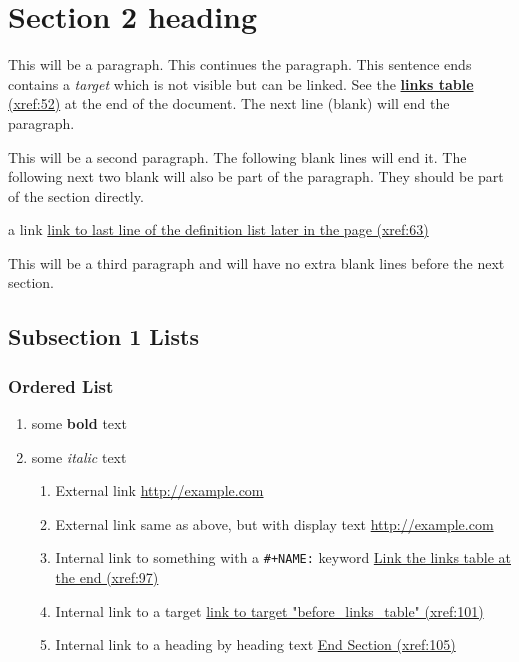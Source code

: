 \documentclass[11pt]{article}
\begin{document}
\section{Section 2 heading  }
 \label{obj-42}
 \label{obj-41}
\begin{quote}
\end{quote}

This will be a paragraph.
This continues the paragraph. This sentence ends contains a
\emph{target}
\label{obj-50} 
which is not visible but can be linked. See the
\hyperref[obj-385]{\textbf{links table} (xref:52)}
at the end of the document.  The next line (blank) will end the
paragraph.

This will be a second paragraph. 
The following blank lines will end it.
The following next two blank will also be part of the paragraph.
They should be part of the section directly.

a link
\hyperref[obj-164]{link to last line of the definition list later in the page (xref:63)}

\vspace{\baselineskip}
This will be a third paragraph and will have no extra blank lines before the next section.

\subsection{Subsection 1 Lists  }
 \label{obj-69}
 \label{obj-68}
\subsubsection{Ordered List  }
 \label{obj-72}
 \label{obj-71}

\begin{enumerate}
\item
some
\textbf{bold}
text
\item
some
\emph{italic}
text
\begin{enumerate}
\item
External link
\href{http://example.com}{http://example.com}
\item
External link same as above, but with display text
\href{http://example.com}{http://example.com}
\item
Internal link to something with a
\texttt{\#+NAME:}
keyword
\hyperref[obj-385]{Link the links table at the end (xref:97)}
\item
Internal link to a target
\hyperref[obj-384]{link to target "before\_links\_table" (xref:101)}
\item
Internal link to a heading by heading text
\hyperref[obj-381]{End Section (xref:105)}
\end{enumerate}
\end{enumerate}
\end{document}
